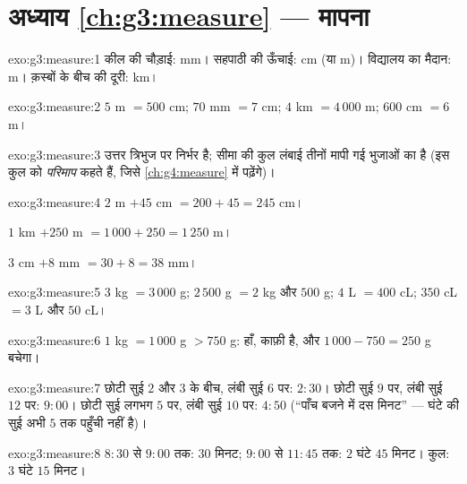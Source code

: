 \section*{अध्याय \ref{ch:g3:measure} --- मापना}

\begin{solution}{exo:g3:measure:1}
कील की चौड़ाई: mm। सहपाठी की ऊँचाई: cm (या m)। विद्यालय का मैदान: m।
क़स्बों के बीच की दूरी: km।
\end{solution}

\begin{solution}{exo:g3:measure:2}
$5$ m $= 500$ cm; \quad $70$ mm $= 7$ cm; \quad
$4$ km $= 4\,000$ m; \quad $600$ cm $= 6$ m।
\end{solution}

\begin{solution}{exo:g3:measure:3}
उत्तर त्रिभुज पर निर्भर है; सीमा की कुल लंबाई तीनों मापी गई
भुजाओं का  है (इस कुल को \emph{परिमाप} कहते हैं, जिसे
\cref{ch:g4:measure} में पढ़ेंगे)।
\end{solution}

\begin{solution}{exo:g3:measure:4}
$2$ m $+ 45$ cm $= 200 + 45 = 245$ cm।

$1$ km $+ 250$ m $= 1\,000 + 250 = 1\,250$ m।

$3$ cm $+ 8$ mm $= 30 + 8 = 38$ mm।
\end{solution}

\begin{solution}{exo:g3:measure:5}
$3$ kg $= 3\,000$ g; \quad $2\,500$ g $= 2$ kg और $500$ g; \quad
$4$ L $= 400$ cL; \quad $350$ cL $= 3$ L और $50$ cL।
\end{solution}

\begin{solution}{exo:g3:measure:6}
$1$ kg $= 1\,000$ g $> 750$ g: हाँ, काफ़ी है, और
$1\,000 - 750 = 250$ g बचेगा।
\end{solution}

\begin{solution}{exo:g3:measure:7}
छोटी सुई $2$ और $3$ के बीच, लंबी सुई $6$ पर: $2{:}30$।
छोटी सुई $9$ पर, लंबी सुई $12$ पर: $9{:}00$। छोटी सुई लगभग
$5$ पर, लंबी सुई $10$ पर: $4{:}50$ (``पाँच बजने में दस मिनट''
--- घंटे की सुई अभी $5$ तक पहुँची नहीं है)।
\end{solution}

\begin{solution}{exo:g3:measure:8}
$8{:}30$ से $9{:}00$ तक: $30$ मिनट; $9{:}00$ से $11{:}45$ तक:
$2$ घंटे $45$ मिनट। कुल: $3$ घंटे $15$ मिनट।
\end{solution}

